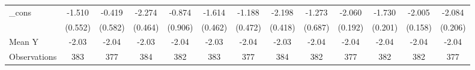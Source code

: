 {\begin{tabular}{l*{12}{c}}
\addlinespace
\_cons      &      -1.510\sym{**} &      -0.419         &      -2.274\sym{***}&      -0.874         &      -1.614\sym{***}&      -1.188\sym{**} &      -2.198\sym{***}&      -1.273\sym{*}  &      -2.060\sym{***}&      -1.730\sym{***}&      -2.005\sym{***}&      -2.084\sym{***}\\
            &     (0.552)         &     (0.582)         &     (0.464)         &     (0.906)         &     (0.462)         &     (0.472)         &     (0.418)         &     (0.687)         &     (0.192)         &     (0.201)         &     (0.158)         &     (0.206)         \\
\midrule
Mean Y      &       -2.03         &       -2.04         &       -2.03         &       -2.04         &       -2.03         &       -2.04         &       -2.03         &       -2.04         &       -2.04         &       -2.04         &       -2.04         &       -2.04         \\
Observations&         383         &         377         &         384         &         382         &         383         &         377         &         384         &         382         &         377         &         382         &         382         &         377         \\
\bottomrule
\end{tabular}
}

